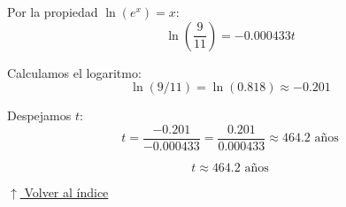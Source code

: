 \documentclass[12pt]{article}
\newcommand{\volverindice}{%
    \vspace{1em}%
    \begin{flushright}%
        \hyperlink{indice}{\small $\uparrow$ Volver al índice}%
    \end{flushright}%
}
\begin{document}
\begin{enumerate}[label=\alph*.-]
\begin{enumerate}[label=\roman*.]
        Por la propiedad $\ln(e^x) = x$:
        \[\ln\left(\frac{9}{11}\right) = -0.000433t\]
        
        Calculamos el logaritmo:
        \[\ln(9/11) = \ln(0.818) \approx -0.201\]
        
        Despejamos $t$:
        \[t = \frac{-0.201}{-0.000433} = \frac{0.201}{0.000433} \approx 464.2 \text{ años}\]
        
        \[\boxed{t \approx 464.2 \text{ años}}\]
        
    \end{enumerate}
\end{enumerate}

\volverindice
\end{document}
